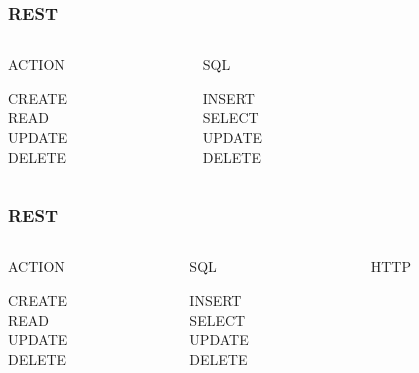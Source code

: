 \begin{frame}
  \frametitle{REST}
  \begin{columns}
    \begin{column}{2cm}
      \begin{center}
        ACTION
      \end{center}
      CREATE\\
      READ\\
      UPDATE\\
      DELETE
    \end{column}    
    \begin{column}{2cm}
      \begin{center}
        SQL
      \end{center}
      INSERT\\
      SELECT\\
      UPDATE\\
      DELETE
    \end{column}
    \begin{column}{2cm}      
    \end{column}
  \end{columns}
\end{frame}

\begin{frame}
  \frametitle{REST}
  \begin{columns}
    \begin{column}{2cm}
      \begin{center}
        ACTION
      \end{center}
      CREATE\\
      READ\\
      UPDATE\\
      DELETE
    \end{column}    
    \begin{column}{2cm}
      \begin{center}
        SQL
      \end{center}
      INSERT\\
      SELECT\\
      UPDATE\\
      DELETE
    \end{column}
    \begin{column}{2cm}   
      \begin{center}
        HTTP
      \end{center}
      \\
      \\
      \\
    \end{column}
  \end{columns}
\end{frame}

